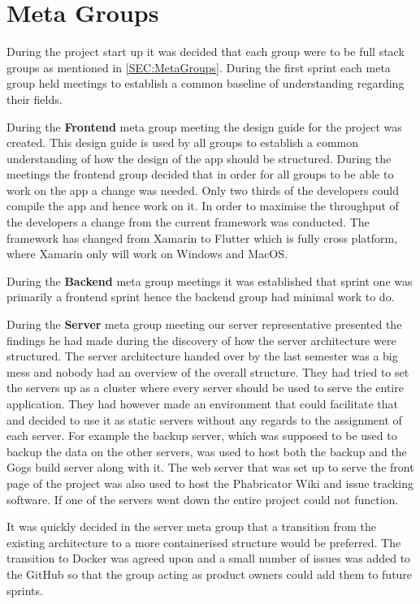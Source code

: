 \section{Meta Groups}
During the project start up it was decided that each group were to be full stack groups as mentioned in \autoref{SEC:MetaGroups}.
During the first sprint each meta group held meetings to establish a common baseline of understanding regarding their fields. 

During the \textbf{Frontend} meta group meeting the design guide for the project was created. 
This design guide is used by all groups to establish a common understanding of how the design of the app should be structured. 
During the meetings the frontend group decided that in order for all groups to be able to work on the app a change was needed. 
Only two thirds of the developers could compile the app and hence work on it. 
In order to maximise the throughput of the developers a change from the current framework was conducted.
The framework has changed from Xamarin to Flutter which is fully cross platform, where Xamarin only will work on Windows and MacOS. 

During the \textbf{Backend} meta group meetings it was established that sprint one was primarily a frontend sprint hence the backend group had minimal work to do. 

During the \textbf{Server} meta group meeting our server representative presented the findings he had made during the discovery of how the server architecture were structured. 
The server architecture handed over by the last semester was a big mess and nobody had an overview of the overall structure.
They had tried to set the servers up as a cluster where every server should be used to serve the entire application. 
They had however made an environment that could facilitate that and decided to use it as static servers without any regards to the assignment of each server. 
For example the backup server, which was supposed to be used to backup the data on the other servers, was used to host both the backup and the Gogs build server along with it. 
The web server that was set up to serve the front page of the project was also used to host the Phabricator Wiki and issue tracking software.
If one of the servers went down the entire project could not function. 

It was quickly decided in the server meta group that a transition from the existing architecture to a more containerised structure would be preferred. 
The transition to Docker was agreed upon and a small number of issues was added to the GitHub so that the group acting as product owners could add them to future sprints. 
